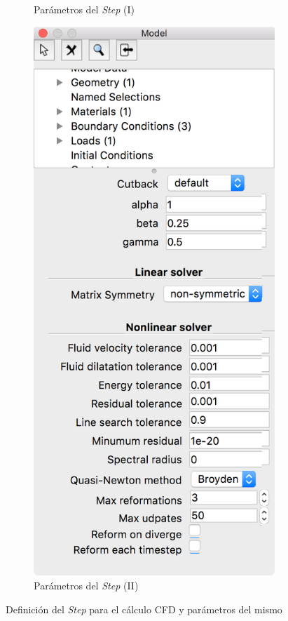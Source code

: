 \begin{figure}[!ht]
\begin{subfigure}[b]{0.25\textwidth}
\caption{Parámetros del \emph{Step} (I)}
\label{fig:pre-06-b}
\end{subfigure}
\hfil
\begin{subfigure}[b]{0.25\textwidth}
\includegraphics[width=\linewidth]{figuras_4/06_pre_step-2.png}
\caption{Parámetros del \emph{Step} (II)}
\label{fig:pre-06-c}
\end{subfigure}
\caption{Definición del \emph{Step} para el cálculo CFD y parámetros del mismo}
\label{fig:pre-06}
\end{figure}

